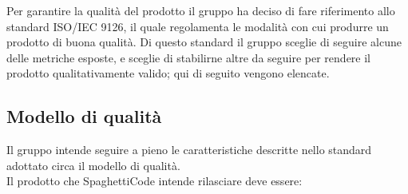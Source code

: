 \documentclass[../piano_di_qualifica.tex]{subfiles}
\begin{document}
Per garantire la qualità del prodotto il gruppo ha deciso di fare riferimento allo standard
ISO/IEC 9126, il quale regolamenta le modalità con cui produrre un prodotto di buona qualità. Di questo standard il gruppo sceglie di seguire alcune delle metriche esposte, e sceglie di stabilirne altre da seguire per rendere il prodotto qualitativamente valido; qui di seguito vengono elencate.

\subsection{Modello di qualità}
Il gruppo intende seguire a pieno le caratteristiche descritte nello standard adottato circa il modello di qualità.\\
Il prodotto che SpaghettiCode intende rilasciare deve essere:\\
\end{document}
